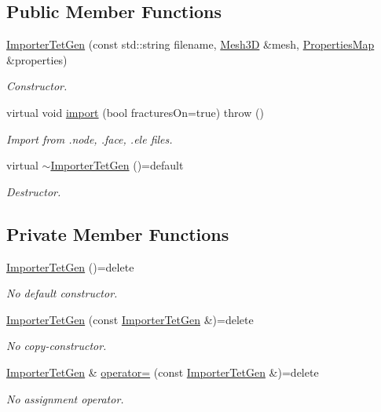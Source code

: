 \subsection*{Public Member Functions}
\begin{DoxyCompactItemize}
\item 
\hyperlink{classFVCode3D_1_1ImporterTetGen_a62b2b88ef8b2007dc2b99269ee7401af}{Importer\+Tet\+Gen} (const std\+::string filename, \hyperlink{classFVCode3D_1_1Mesh3D}{Mesh3D} \&mesh, \hyperlink{classFVCode3D_1_1PropertiesMap}{Properties\+Map} \&properties)
\begin{DoxyCompactList}\small\item\em Constructor. \end{DoxyCompactList}\item 
virtual void \hyperlink{classFVCode3D_1_1ImporterTetGen_a37d0191b42bbb7af28f5c42acb1185b7}{import} (bool fractures\+On=true)  throw ()
\begin{DoxyCompactList}\small\item\em Import from .node, .face, .ele files. \end{DoxyCompactList}\item 
virtual \hyperlink{classFVCode3D_1_1ImporterTetGen_a0fc6143f3dee819cf710373da338d6fe}{$\sim$\+Importer\+Tet\+Gen} ()=default
\begin{DoxyCompactList}\small\item\em Destructor. \end{DoxyCompactList}\end{DoxyCompactItemize}
\subsection*{Private Member Functions}
\begin{DoxyCompactItemize}
\item 
\hyperlink{classFVCode3D_1_1ImporterTetGen_a7bbfeddc1da159dee05326689f9ee91a}{Importer\+Tet\+Gen} ()=delete
\begin{DoxyCompactList}\small\item\em No default constructor. \end{DoxyCompactList}\item 
\hyperlink{classFVCode3D_1_1ImporterTetGen_a0962c9fe446382b84f84c3db3831ce14}{Importer\+Tet\+Gen} (const \hyperlink{classFVCode3D_1_1ImporterTetGen}{Importer\+Tet\+Gen} \&)=delete
\begin{DoxyCompactList}\small\item\em No copy-\/constructor. \end{DoxyCompactList}\item 
\hyperlink{classFVCode3D_1_1ImporterTetGen}{Importer\+Tet\+Gen} \& \hyperlink{classFVCode3D_1_1ImporterTetGen_a182ceb006e50c591f4a9f7adfa012bd8}{operator=} (const \hyperlink{classFVCode3D_1_1ImporterTetGen}{Importer\+Tet\+Gen} \&)=delete
\begin{DoxyCompactList}\small\item\em No assignment operator. \end{DoxyCompactList}\end{DoxyCompactItemize}
